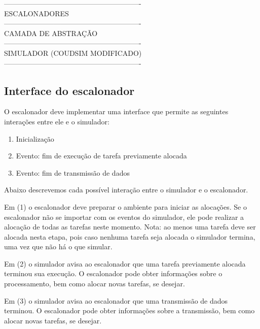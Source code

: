 \documentclass[a4paper,10pt, draft]{article}
\begin{document}
\begin{center}
----------------------------------------------------------\\
                ESCALONADORES                 \\
----------------------------------------------------------\\
             CAMADA DE ABSTRAÇÃO              \\
----------------------------------------------------------\\
        SIMULADOR (COUDSIM MODIFICADO)        \\
----------------------------------------------------------\\
\end{center}

\subsection{Interface do escalonador}

O escalonador deve implementar uma interface que permite as seguintes
interações entre ele e o simulador:

\begin{enumerate}

  \item Inicialização
  \item Evento: fim de execução de tarefa previamente alocada
  \item Evento: fim de transmissão de dados

\end{enumerate}

Abaixo descrevemos cada possível interação entre o simulador e o escalonador.

Em (1) o escalonador deve preparar o ambiente para iniciar as alocações. Se o escalonador
não se importar com os eventos do simulador, ele pode realizar a alocação de todas as tarefas
neste momento. Nota: ao menos uma tarefa deve ser alocada nesta etapa, pois caso nenhuma tarefa
seja alocada o simulador termina, uma vez que não há o que simular.

Em (2) o simulador avisa ao escalonador que uma tarefa previamente alocada terminou sua execução.
O escalonador pode obter informações sobre o processamento, bem como alocar novas tarefas, se desejar.

Em (3) o simulador avisa ao escalonador que uma transmissão de dados terminou.
O escalonador pode obter informações sobre a transmissão, bem como alocar novas tarefas, se desejar.
\end{document}
